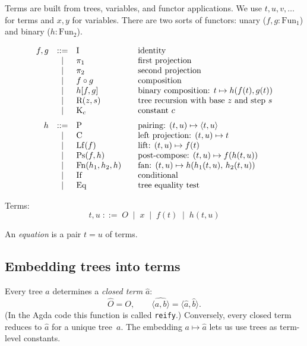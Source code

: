 \documentclass[11pt]{article}
\newcommand{\pair}[2]{\langle #1, #2 \rangle}
\begin{document}
Terms are built from trees, variables, and functor applications.
We use $t, u, v, \ldots$ for terms and $x, y$ for variables.
There are two sorts of functors: unary ($f, g : \mathrm{Fun}_1$)
and binary ($h : \mathrm{Fun}_2$).

\[
\begin{array}{rcl@{\qquad}l}
  f, g &::=& \mathrm{I} & \text{identity} \\
       &\mid& \pi_1 & \text{first projection} \\
       &\mid& \pi_2 & \text{second projection} \\
       &\mid& f \circ g & \text{composition} \\
       &\mid& h[f, g] & \text{binary composition: } t \mapsto h(f(t), g(t)) \\
       &\mid& \mathrm{R}(z, s) & \text{tree recursion with base } z \text{ and step } s \\
       &\mid& \mathrm{K}_c & \text{constant } c \\[6pt]
  h &::=& \mathrm{P} & \text{pairing: } (t, u) \mapsto \pair{t}{u} \\
    &\mid& \mathrm{C} & \text{left projection: } (t, u) \mapsto t \\
    &\mid& \mathrm{Lf}(f) & \text{lift: } (t, u) \mapsto f(t) \\
    &\mid& \mathrm{Ps}(f, h) & \text{post-compose: } (t, u) \mapsto f(h(t, u)) \\
    &\mid& \mathrm{Fn}(h_1, h_2, h) & \text{fan: } (t, u) \mapsto h(h_1(t,u),\, h_2(t,u)) \\
    &\mid& \mathrm{If} & \text{conditional} \\
    &\mid& \mathrm{Eq} & \text{tree equality test}
\end{array}
\]

Terms:
\[
  t, u \;::=\; O \;\mid\; x \;\mid\; f(t) \;\mid\; h(t, u)
\]

An \emph{equation} is a pair $t = u$ of terms.

\subsection*{Embedding trees into terms}

Every tree $a$ determines a \emph{closed term} $\hat{a}$:
\[
  \hat{O} = O, \qquad \widehat{\pair{a}{b}} = \pair{\hat a}{\hat b}.
\]
(In the Agda code this function is called \texttt{reify}.)
Conversely, every closed term reduces to $\hat{a}$ for a unique
tree~$a$. The embedding $a \mapsto \hat{a}$ lets us use trees as
term-level constants.
\end{document}
